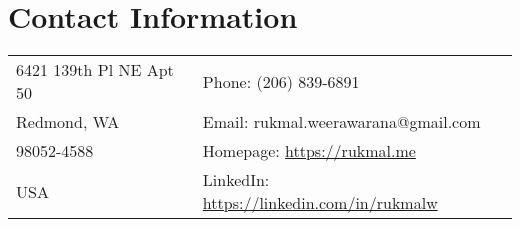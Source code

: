 \documentclass[10pt]{article}
\begin{document}
    


    \section{Contact Information}
    
    \setlength{\tabcolsep}{18pt}

    \begin{center}
        \begin{tabular}{ll}
            6421 139th Pl NE Apt 50 & Phone: (206) 839-6891 \\
            Redmond, WA & Email: rukmal.weerawarana@gmail.com \\
            98052-4588 & Homepage: \url{https://rukmal.me} \\
            USA & LinkedIn: \url{https://linkedin.com/in/rukmalw}
        \end{tabular}
    \end{center}
\end{document}
